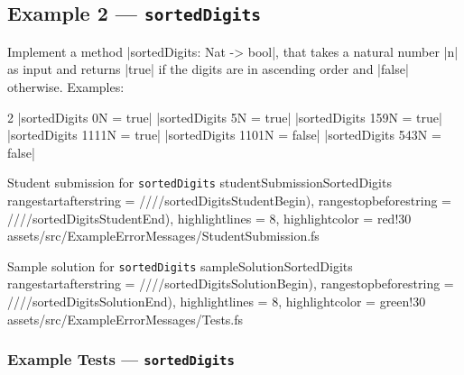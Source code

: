 \subsection{Example 2 --- \texttt{sortedDigits}} %


Implement a method \fsharp|sortedDigits: Nat -> bool|,
that takes a natural number \fsharp|n| as input and returns
\fsharp|true| if the digits are in ascending order and \fsharp|false| otherwise. Examples:
\begin{center}\begin{multicols}{2}
	\noindent
	\fsharp|sortedDigits 0N = true|
	\fsharp|sortedDigits 5N = true|
	\fsharp|sortedDigits 159N = true|
	\fsharp|sortedDigits 1111N = true|
	\fsharp|sortedDigits 1101N = false|
	\fsharp|sortedDigits 543N = false|
\end{multicols}\end{center}




\fsharpinput%
{Student submission for \texttt{sortedDigits}}%
{studentSubmissionSortedDigits}%
{
	rangestartafterstring = ////sortedDigitsStudentBegin),
	rangestopbeforestring = ////sortedDigitsStudentEnd),
	highlightlines = {8},
	highlightcolor = red!30
}%
{assets/src/ExampleErrorMessages/StudentSubmission.fs}




\fsharpinput%
{Sample solution for \texttt{sortedDigits}}%
{sampleSolutionSortedDigits}%
{
	rangestartafterstring = ////sortedDigitsSolutionBegin),
	rangestopbeforestring = ////sortedDigitsSolutionEnd),
	highlightlines = {8},
	highlightcolor = green!30
}%
{assets/src/ExampleErrorMessages/Tests.fs}


\newpage %
\subsubsection{Example Tests --- \texttt{sortedDigits}} %


